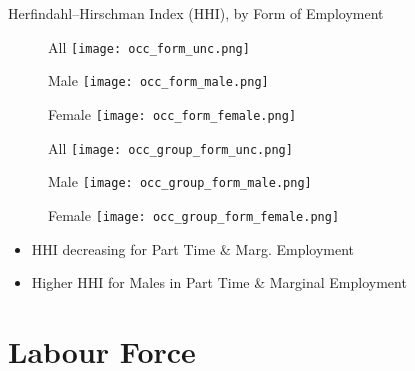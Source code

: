 \documentclass[hyperref={bookmarks=false}]{beamer}
\begin{document}
\begin{appendix}
\begin{frame}{Herfindahl–Hirschman Index (HHI), by Form of Employment}
\begin{figure}[!t]
\centering
\begin{minipage}[b]{0.32\textwidth}{All}
\centering
\texttt{[image: occ\_form\_unc.png]}
\end{minipage}
\begin{minipage}[b]{0.32\textwidth}{Male}
\centering
\texttt{[image: occ\_form\_male.png]}
\end{minipage}
\begin{minipage}[b]{0.32\textwidth}{Female}
\centering
\texttt{[image: occ\_form\_female.png]}
\end{minipage}
\begin{minipage}[b]{0.32\textwidth}{All}
\centering
\texttt{[image: occ\_group\_form\_unc.png]}
\end{minipage}
\begin{minipage}[b]{0.32\textwidth}{Male}
\centering
\texttt{[image: occ\_group\_form\_male.png]}
\end{minipage}
\begin{minipage}[b]{0.32\textwidth}{Female}
\centering
\texttt{[image: occ\_group\_form\_female.png]}
\end{minipage}
\end{figure}
\begin{itemize}
\item HHI decreasing for Part Time \& Marg. Employment
\item Higher HHI for Males in Part Time \& Marginal Employment
\end{itemize}
\hyperlink{DATA4}{}
\end{frame}



\section{Labour Force}
\subsection{}

\begin{frame}
\label{LF}
\end{frame}




\end{appendix}
\end{document}
